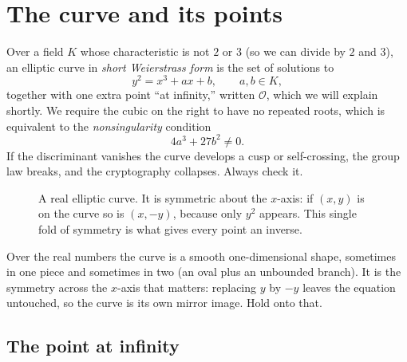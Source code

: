 \section{The curve and its points}
\label{ch21:curve}

Over a field $K$ whose characteristic is not $2$ or $3$ (so we can divide by $2$ and
$3$), an elliptic curve in \emph{short Weierstrass form} is the set of solutions to
\begin{equation}
\label{ch21:weierstrass}
y^2 = x^3 + ax + b, \qquad a,b \in K,
\end{equation}
together with one extra point ``at infinity,'' written $\mathcal{O}$, which we will
explain shortly. We require the cubic on the right to have no repeated roots, which is
equivalent to the \emph{nonsingularity} condition
\begin{equation}
\label{ch21:discriminant}
4a^3 + 27 b^2 \neq 0.
\end{equation}
If the discriminant vanishes the curve develops a cusp or self-crossing, the group law
breaks, and the cryptography collapses. Always check it.

\begin{figure}[H]
\centering
{}
\caption{A real elliptic curve. It is symmetric about the $x$-axis: if $(x,y)$ is on
the curve so is $(x,-y)$, because only $y^2$ appears. This single fold of symmetry is
what gives every point an inverse.}
\label{ch21:realcurve}
\end{figure}

Over the real numbers the curve is a smooth one-dimensional shape, sometimes in one
piece and sometimes in two (an oval plus an unbounded branch). It is the symmetry
across the $x$-axis that matters: replacing $y$ by $-y$ leaves the equation untouched,
so the curve is its own mirror image. Hold onto that.

\subsection{The point at infinity}

